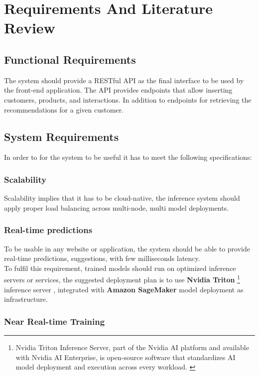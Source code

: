 \chapter{Requirements And Literature Review}
\minitoc

\section{Functional Requirements}

The system should provide a RESTful API as the final interface to be used by the front-end application.
The API provides endpoints that allow inserting customers, products, and interactions. In addition to endpoints for retrieving the recommendations for a given customer.

\section{System Requirements}

In order to for the system to be useful it has to meet the following specifications:

\subsection{Scalability}
Scalability implies that it has to be cloud-native, the inference system should apply proper load balancing across multi-node, multi model deployments.

\subsection{Real-time predictions}
To be usable in any website or application, the system should be able to provide real-time predictions, suggestions, with few milliseconds latency. \\

To fulfil this requirement, trained models should run on optimized inference servers or services, the suggested deployment plan is to use
\textbf{Nvidia Triton}
\footnote{Nvidia Triton Inference Server, part of the Nvidia AI platform and available with Nvidia AI Enterprise, is open-source software that standardizes AI model deployment and execution across every workload. \cite{Triton}}
inference server \cite{Triton}, 
integrated with \textbf{Amazon SageMaker} model deployment \cite{SageMaker} as infrastructure.

\subsection{Near Real-time Training}

